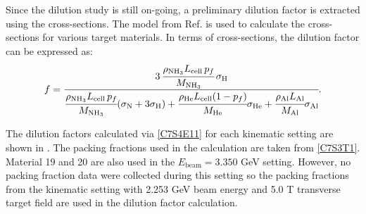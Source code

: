 Since the dilution study is still on-going, a preliminary dilution factor is extracted using the cross-sections. The model from Ref. \cite{Bosted2008} is used to calculate the cross-sections for various target materials. In terms of cross-sections, the dilution factor can be expressed as:
\begin{equation} \label{C7S4E11}
f = \cfrac{3\,\cfrac{\rho_{\mathrm{NH_3}}L_{\mathrm{cell}}\,p_f}{M_{\mathrm{NH_3}}}\,\sigma_{\mathrm{H}}}{\cfrac{\rho_{\mathrm{NH_3}}L_{\mathrm{cell}}\,p_f}{M_{\mathrm{NH_3}}}(\sigma_{\mathrm{N}}+3\sigma_{\mathrm{H}})+\cfrac{\rho_{\mathrm{He}}L_{\mathrm{cell}}(1-p_f)}{M_{\mathrm{He}}}\sigma_{\mathrm{He}}+\cfrac{\rho_{\mathrm{Al}}L_{\mathrm{Al}}}{M_{\mathrm{Al}}}\sigma_{\mathrm{Al}}}.
\end{equation}

The dilution factors calculated via \cref{C7S4E11} for each kinematic setting are shown in . The packing fractions used in the calculation are taken from \cref{C7S3T1}. Material 19 and 20 are also used in the $E_{\mathrm{beam}}=3.350$ GeV setting. However, no packing fraction data were collected during this setting so the packing fractions from the kinematic setting with 2.253 GeV beam energy and 5.0 T transverse target field are used in the dilution factor calculation.

